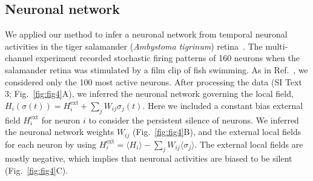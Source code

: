 \documentclass[prx,twocolumn,twoside,showpacs,superscriptaddress]{revtex4-1}
\begin{document}
\subsection{Neuronal network}
We applied our method to infer a neuronal network from temporal neuronal activities in the tiger salamander ({\it Ambystoma tigrinum}) retina~\cite{Marre2017}.
The multi-channel experiment recorded stochastic firing patterns of 160 neurons when the salamander retina was stimulated by a film clip of fish swimming. 
As in Ref.~\cite{Tkacik2014}, %
we considered only the 100 most active neurons. %
After processing the data (SI Text 3; Fig.~\ref{fig:fig4}A), we inferred the neuronal network governing the local field, $H_i(\sigma(t))=H_{i}^{\textrm{ext}} + \sum_{j} W_{ij}\sigma_{j}(t)$.
Here we included a constant bias external field $H_{i}^{\textrm{ext}}$ for neuron $i$ to consider the persistent silence of neurons.
We inferred the neuronal network weights $W_{ij}$ (Fig.~\ref{fig:fig4}B), and the external local fields for each neuron by using $H_{i}^{\textrm{ext}} = \langle H_i \rangle - \sum_{j} W_{ij} \langle \sigma_{j} \rangle $.  
The external local fields are mostly negative, which implies that neuronal activities are biased to be silent (Fig.~\ref{fig:fig4}C).
\end{document}
